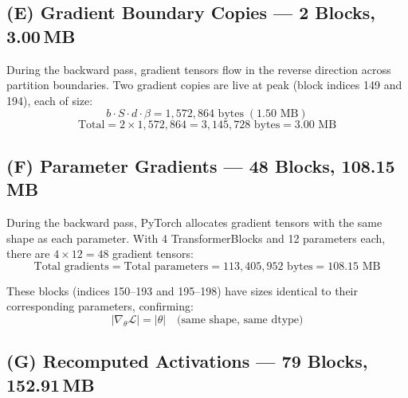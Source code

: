 \documentclass[11pt,a4paper]{article}
\begin{document}
\subsection{(E) Gradient Boundary Copies --- 2 Blocks, 3.00\,MB}
\label{sec:grad_boundary}

During the backward pass, gradient tensors flow in the reverse direction across partition boundaries.  Two gradient copies are live at peak (block indices 149 and 194), each of size:
\begin{equation}
  b \cdot S \cdot d \cdot \beta = 1{,}572{,}864 \text{~bytes} \;(1.50 \text{~MB})
\end{equation}
\begin{equation}
  \text{Total} = 2 \times 1{,}572{,}864 = 3{,}145{,}728 \text{~bytes} = 3.00 \text{~MB}
\end{equation}

\subsection{(F) Parameter Gradients --- 48 Blocks, 108.15\,MB}
\label{sec:gradients}

During the backward pass, PyTorch allocates gradient tensors with the same shape as each parameter.  With 4 TransformerBlocks and 12 parameters each, there are $4 \times 12 = 48$ gradient tensors:
\begin{equation}
  \text{Total gradients} = \text{Total parameters} = 113{,}405{,}952 \text{~bytes} = 108.15 \text{~MB}
\end{equation}

These blocks (indices 150--193 and 195--198) have sizes identical to their corresponding parameters, confirming:
\begin{equation}
  |\nabla_{\theta} \mathcal{L}| = |\theta| \quad \text{(same shape, same dtype)}
\end{equation}

\subsection{(G) Recomputed Activations --- 79 Blocks, 152.91\,MB}
\label{sec:activations}
\end{document}
